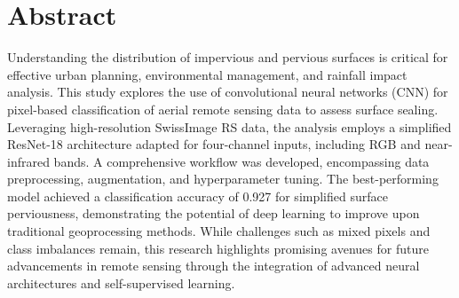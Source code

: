 

\vspace*{\fill}

\section*{Abstract}
\label{abstract}

Understanding the distribution of impervious and pervious surfaces is critical 
for effective urban planning, environmental management, and rainfall impact analysis. 
This study explores the use of convolutional neural networks (CNN) for 
pixel-based classification of aerial remote sensing data to assess surface sealing. 
Leveraging high-resolution SwissImage RS data, the analysis employs a simplified 
ResNet-18 architecture adapted for four-channel inputs, including RGB and 
near-infrared bands. A comprehensive workflow was developed, encompassing 
data preprocessing, augmentation, and hyperparameter tuning. The best-performing 
model achieved a classification accuracy of 0.927 for simplified surface perviousness, 
demonstrating the potential of deep learning to improve upon traditional 
geoprocessing methods. While challenges such as mixed pixels and class imbalances remain, 
this research highlights promising avenues for future advancements 
in remote sensing through the integration of advanced neural architectures and self-supervised learning.

\vspace*{\fill}
